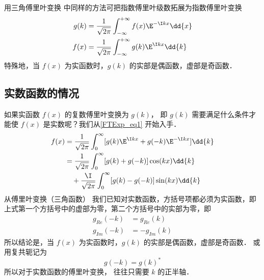 
\begin{issues}
\issueAbstract
\issueTODO
\end{issues}


用三角傅里叶变换  中同样的方法可把指数傅里叶级数拓展为指数傅里叶变换
\begin{align}\label{FTExp_eq6}
g(k) &= \frac{1}{\sqrt{2\pi }} \int_{-\infty }^{+\infty } f(x)\E^{-\I kx} \dd{x} \\
f(x) &= \frac{1}{\sqrt{2\pi }} \int_{-\infty }^{+\infty } g(k)\E^{\I kx} \dd{k} \label{FTExp_eq1}
\end{align}
特殊地，当 $f(x)$ 为实函数时，$g(k)$ 的实部是偶函数，虚部是奇函数．

\subsection{实数函数的情况}

如果实函数 $f(x)$ 的复数傅里叶变换为 $g(k)$， 即 $g(k)$ 需要满足什么条件才能使 $f(x)$ 是实数呢？我们从\autoref{FTExp_eq1} 开始入手．
\begin{equation}\begin{aligned}
f(x) &= \frac{1}{\sqrt{2\pi }} \int_0^\infty [g(k)\E^{\I kx} + g(-k)\E^{-\I kx}] \dd{k} \\
&= \frac{1}{\sqrt{2\pi }} \int_0^\infty [g(k)+g(-k)]\cos(kx)\dd{k}\\
&\quad + \frac{\I}{\sqrt{2\pi }} \int_0^\infty [g(k)-g(-k)]\sin(kx) \dd{k}
\end{aligned}\end{equation}
从傅里叶变换（三角函数）%
我们已知对实数函数，方括号项都必须为实函数，即上式第一个方括号中的虚部为零，第二个方括号中的实部为零，即
\begin{equation}\begin{aligned}
g_{Re}(-k) &= g_{Re}(k)\\
g_{Im}(-k) &= -g_{Im}(k)
\end{aligned}\end{equation}
所以结论是，当 $f(x)$ 为实函数时，$g(k)$ 的实部是偶函数，虚部是奇函数． 或用复共轭记为
\begin{equation}\label{FTExp_eq5}
g(-k) = g(k)^*
\end{equation}
所以对于实数函数的傅里叶变换， 往往只需要 $k$ 的正半轴．

